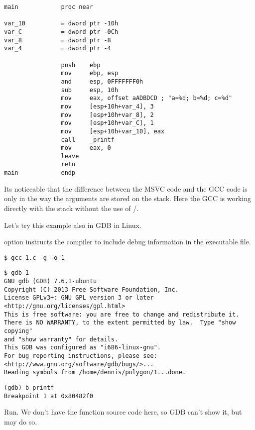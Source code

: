 \begin{lstlisting}
main            proc near

var_10          = dword ptr -10h
var_C           = dword ptr -0Ch
var_8           = dword ptr -8
var_4           = dword ptr -4

                push    ebp
                mov     ebp, esp
                and     esp, 0FFFFFFF0h
                sub     esp, 10h
                mov     eax, offset aADBDCD ; "a=%d; b=%d; c=%d"
                mov     [esp+10h+var_4], 3
                mov     [esp+10h+var_8], 2
                mov     [esp+10h+var_C], 1
                mov     [esp+10h+var_10], eax
                call    _printf
                mov     eax, 0
                leave
                retn
main            endp
\end{lstlisting}

Its noticeable that the difference between the MSVC code and the GCC code is only in the way the arguments are stored on the stack.
Here the GCC is working directly with the stack without the use of \PUSH/\POP.


Let's try this example also in \ac{GDB} in Linux.

 option instructs the compiler to include debug information in the executable file.

\begin{lstlisting}
$ gcc 1.c -g -o 1
\end{lstlisting}

\begin{lstlisting}
$ gdb 1
GNU gdb (GDB) 7.6.1-ubuntu
Copyright (C) 2013 Free Software Foundation, Inc.
License GPLv3+: GNU GPL version 3 or later <http://gnu.org/licenses/gpl.html>
This is free software: you are free to change and redistribute it.
There is NO WARRANTY, to the extent permitted by law.  Type "show copying"
and "show warranty" for details.
This GDB was configured as "i686-linux-gnu".
For bug reporting instructions, please see:
<http://www.gnu.org/software/gdb/bugs/>...
Reading symbols from /home/dennis/polygon/1...done.
\end{lstlisting}

\begin{lstlisting}[caption=let's set breakpoint on \printf]
(gdb) b printf
Breakpoint 1 at 0x80482f0
\end{lstlisting}

Run.
We don't have the \printf function source code here, so \ac{GDB} can't show it, but may do so.

